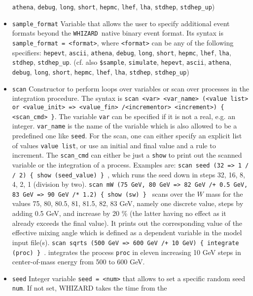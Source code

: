 \documentclass[12pt]{book}
\newcommand{\ttt}[1]{\texttt{#1}}
\newcommand{\whizard}{\texttt{WHIZARD}}
\begin{document}
\begin{itemize}
\ttt{athena}, \ttt{debug}, \ttt{long}, \ttt{short}, \ttt{hepmc}, 
\ttt{lhef}, \ttt{lha}, \ttt{stdhep}, \ttt{stdhep\_up}) 
\item
\ttt{sample\_format} \newline
Variable that allows the user to specify additional event formats
beyond the \whizard\ native binary event format. Its syntax is 
\ttt{sample\_format = <format>}, where \ttt{<format>} can be any of
the following specifiers: \ttt{hepevt}, \ttt{ascii},
\ttt{athena}, \ttt{debug}, \ttt{long}, \ttt{short}, \ttt{hepmc}, 
\ttt{lhef}, \ttt{lha}, \ttt{stdhep}, \ttt{stdhep\_up}.
(cf. also \ttt{\$sample}, \ttt{simulate}, \ttt{hepevt}, \ttt{ascii},
\ttt{athena}, \ttt{debug}, \ttt{long}, \ttt{short}, \ttt{hepmc}, 
\ttt{lhef}, \ttt{lha}, \ttt{stdhep}, \ttt{stdhep\_up}) 
\item
\ttt{scan} \newline
Constructor to perform loops over variables or scan over processes in
the integration procedure. The syntax is \ttt{scan <var> <var\_name>
  (<value list> or  <value\_init> => <value\_fin> /<incrementor>
  <increment>) \{ <scan\_cmd> \}}. The variable \ttt{var} can be
specified if it is not a real, e.g. an integer. \ttt{var\_name} is the
name of the variable which is also allowed to be a predefined one like
\ttt{seed}. For the scan, one can either specify an explicit list of
values \ttt{value list}, or use an initial and final value and a
rule to increment. The \ttt{scan\_cmd}  can either be just a
\ttt{show} to print out the scanned variable or the integration of a process.
Examples are: \ttt{scan seed (32 => 1 / / 2) \{ show (seed\_value) \}
}, which runs the seed down in steps 32, 16, 8, 4, 2, 1 (division by
two). \ttt{scan mW (75 GeV, 80 GeV => 82 GeV /+ 0.5 GeV,  83 GeV => 90
GeV /* 1.2) \{ show (sw) \} } scans over the $W$ mass for the values
75, 80, 80.5, 81, 81.5, 82, 83 GeV, namely one discrete value, steps
by adding 0.5 GeV, and increase by 20 \% (the latter having no effect 
as it already exceeds the final value). It prints out the
corresponding value of the effective mixing angle which is defined as
a dependent variable in the model input file(s). \ttt{scan sqrts (500 GeV =>
  600 GeV /+ 10 GeV) \{ integrate (proc) \} }. integrates the process
\ttt{proc} in eleven increasing 10 GeV steps in center-of-mass energy
from 500 to 600 GeV.
\item
\ttt{seed} \newline 
Integer variable \ttt{seed = <num>} that allows to set a specific
random seed \ttt{num}. If not set, WHIZARD takes the time from the

\end{itemize}
\end{document}
